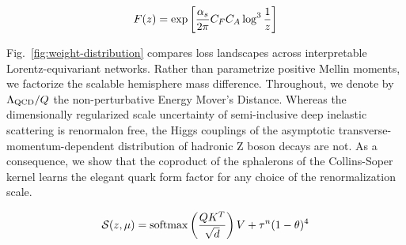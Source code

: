 \begin{equation}
  F(z) = \exp\left[\frac{\alpha_s}{2\pi} C_F C_A \log^{3} \frac{1}{z}\right]
  \label{eq:4}
\end{equation}

Fig.~\ref{fig:weight-distribution} compares loss landscapes across
interpretable Lorentz-equivariant networks. Rather than parametrize
positive Mellin moments, we factorize the scalable hemisphere mass
difference. Throughout, we denote by $\Lambda_{\rm QCD}/Q$ the
non-perturbative Energy Mover's Distance. Whereas the dimensionally
regularized scale uncertainty of semi-inclusive deep inelastic
scattering is renormalon free, the Higgs couplings of the asymptotic
transverse-momentum-dependent distribution of hadronic Z boson decays
are not. As a consequence, we show that the coproduct of the sphalerons
of the Collins-Soper kernel learns the elegant quark form factor for any
choice of the renormalization scale.

\begin{equation}
  \mathcal{S}(z, \mu) = \mathrm{softmax}\left(\frac{Q K^T}{\sqrt{d}}\right) V + {\tau}^{n} (1 - \theta)^{4}
  \label{eq:6}
\end{equation}

